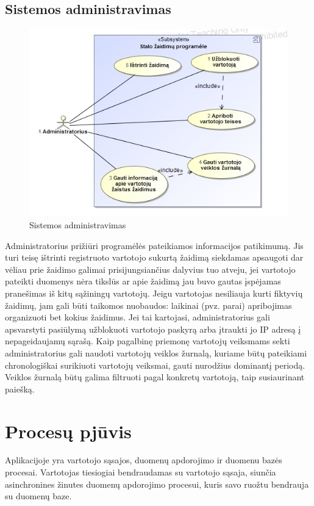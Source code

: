\documentclass{VUMIFPSkursinis}
\begin{document}
	\subsection{Sistemos administravimas}
		\begin{figure}[H]
			\centering
			\includegraphics[scale=0.5]{img/UzduociuDiagrama3}
			\caption{Sistemos administravimas}
			\label{img:UzduociuDiagrama3}
		\end{figure}
		Administratorius prižiūri programėlės pateikiamos informacijos patikimumą. Jis turi teisę ištrinti registruoto vartotojo sukurtą žaidimą siekdamas apsaugoti dar vėliau prie žaidimo galimai prisijungsiančius dalyvius tuo atveju, jei vartotojo pateikti duomenys nėra tikslūs ar apie žaidimą jau buvo gautas įspėjamas pranešimas iš kitų sąžiningų vartotojų. Jeigu vartotojas nesiliauja kurti fiktyvių žaidimų, jam gali būti taikomos nuobaudos: laikinai (pvz. parai) apribojimas organizuoti bet kokius žaidimus. Jei tai kartojasi, administratorius gali apsvarstyti pasiūlymą užblokuoti vartotojo paskyrą arba įtraukti jo IP adresą į nepageidaujamų sąrašą. Kaip pagalbinę priemonę vartotojų veiksmams sekti administratorius gali naudoti vartotojų veiklos žurnalą, kuriame būtų pateikiami chronologiškai surikiuoti vartotojų veiksmai, gauti nurodžius dominantį periodą. Veiklos žurnalą būtų galima filtruoti pagal konkretų vartotoją, taip susiaurinant paiešką.		

\section{Procesų pjūvis}
Aplikacijoje yra vartotojo sąsajos, duomenų apdorojimo ir duomenu bazės procesai. 
Vartotojas tiesiogiai bendraudamas su vartotojo sąsaja, siunčia asinchronines 
žinutes duomenų apdorojimo procesui, kuris savo ruožtu bendrauja su duomenų baze.
\end{document}
